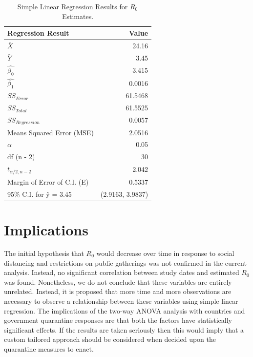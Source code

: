 \documentclass{article}
\begin{document}
\begin{table}[h!]
  \begin{center}
    \caption{Simple Linear Regression Results for $R_0$ Estimates.}
    \label{tab:table2}
    \begin{tabular}{l|r}
    \hline \hline
      \textbf{Regression Result} & \textbf{Value} \\
      \hline
      $\bar{X}$ & 24.16\\
      $\bar{Y}$ & 3.45\\
      $\hat{\beta_{0}}$ & 3.415\\
      $\hat{\beta_{1}}$ & 0.0016\\
      $SS_{Error}$ & 61.5468\\
      $SS_{Total}$ & 61.5525\\
      $SS_{Regression}$ & 0.0057\\
      Means Squared Error (MSE) & 2.0516\\
      $\alpha$ & 0.05\\
      df (n - 2) & 30\\
      $t_{\alpha/2, n-2}$ & 2.042\\
      Margin of Error of C.I. (E) & 0.5337\\
      95\% C.I. for \^{y} = 3.45 & (2.9163, 3.9837)\\
      \hline \hline
    \end{tabular}
  \end{center}
\end{table}

\section{Implications}


The initial hypothesis that $R_0$ would decrease over time in response to social distancing and restrictions on public gatherings was not confirmed in the current analysis. Instead, no significant correlation between study dates and estimated $R_0$ was found. Nonetheless, we do not conclude that these variables are entirely unrelated. Instead, it is proposed that more time and more observations are necessary to observe a relationship between these variables using simple linear regression.
The implications of the two-way ANOVA analysis with countries and
government quarantine responses are that both the
factors have statistically significant effects. If the results
are taken seriously then this would imply that a custom tailored approach should be considered when decided upon the quarantine measures to enact.
\end{document}

